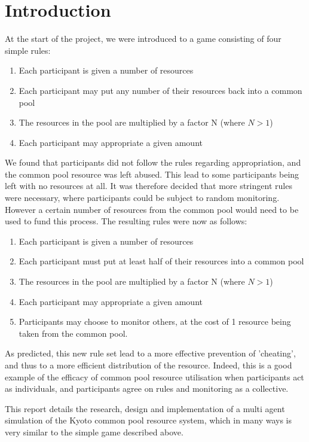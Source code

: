 \section{Introduction}

At the start of the project, we were introduced to a game consisting of four simple rules:

\begin{enumerate}
\item Each participant is given a number of resources
\item Each participant may put any number of their resources back into a common pool
\item	The resources in the pool are multiplied by a factor N (where $N > 1$)
\item	Each participant may appropriate a given amount
\end{enumerate}

We found that participants did not follow the rules regarding appropriation, and the common pool resource was left abused. This lead to some participants being left with no resources at all. It was therefore decided that more stringent rules were necessary, where participants could be subject to random monitoring. However a certain number of resources from the common pool would need to be used to fund this process. The resulting rules were now as follows:

\begin{enumerate}
	\item Each participant is given a number of resources
	\item Each participant must put at least half of their resources into a common pool
	\item The resources in the pool are multiplied by a factor N (where $N > 1$)
	\item Each participant may appropriate a given amount
	\item Participants may choose to monitor others, at the cost of 1 resource being taken from the common pool.
\end{enumerate}

As predicted, this new rule set lead to a more effective prevention of 'cheating', and thus to a more efficient distribution of the resource. Indeed, this is a good example of the efficacy of common pool resource utilisation when participants act as individuals, and participants agree on rules and monitoring as a collective.

This report details the research, design and implementation of a multi agent simulation of the Kyoto common pool resource system, which in many ways is very similar to the simple game described above.
